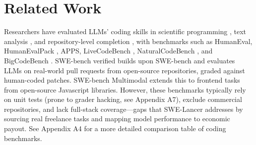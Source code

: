 \section{Related Work}
Researchers have evaluated LLMs’ coding skills in scientific programming \cite{Tian24}, text analysis \cite{Zhong23, Lam24}, and repository-level completion \cite{Zhang24, Liu23}, with benchmarks such as HumanEval, HumanEvalPack \cite{Muennighoff24}, APPS, LiveCodeBench \cite{Jain24}, NaturalCodeBench \cite{Zhang24}, and BigCodeBench \cite{Zhuo24}. SWE-bench verified \cite{Chowdhury24} builds upon SWE-bench \cite{Jiminez24} and evaluates LLMs on real-world pull requests from open-source repositories, graded against human-coded patches. SWE-bench Multimodal \cite{Yang24} extends this to frontend tasks from open-source Javascript libraries. However, these benchmarks typically rely on unit tests (prone to grader hacking, see Appendix A7), exclude commercial repositories, and lack full-stack coverage—gaps that SWE-Lancer addresses by sourcing real freelance tasks and mapping model performance to economic payout. See Appendix A4 for a more detailed comparison table of coding benchmarks.